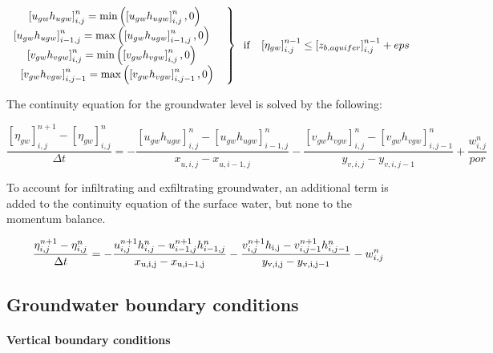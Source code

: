 \begin{equation} \label{2.94)} 
\left. \begin{array}{c} {\left[u_{gw} h_{ugw} \right]_{i,j}^{n} =\min \left(\left[u_{gw} h_{ugw} \right]_{i,j}^{n} ,0\right){\rm \; }} \\ {\left[u_{gw} h_{ugw} \right]_{i-1,j}^{n} =\max \left(\left[u_{gw} h_{ugw} \right]_{i-1,j}^{n} ,0\right){\rm \; \; \; }} \\ {\left[v_{gw} h_{vgw} \right]_{i,j}^{n} =\min \left(\left[v_{gw} h_{vgw} \right]_{i,j}^{n} ,0\right){\rm \; \; \; }} \\ {\left[v_{gw} h_{vgw} \right]_{i,j-1}^{n} =\max \left(\left[v_{gw} h_{vgw} \right]_{i,j-1}^{n} ,0\right)} \end{array}\right\}{\rm \; \; if\; \; \; }\left[\eta _{gw} \right]_{i,j}^{n-1} \le \left[z_{b,aquifer} \right]_{i,j}^{n-1} +eps 
\end{equation} 

The continuity equation for the groundwater level is solved by the following:

\begin{equation} \label{2.95)} 
\frac{\left[\eta _{gw} \right]_{i,j}^{n+1} -\left[\eta _{gw} \right]_{i,j}^{n} }{\Delta t} =-\frac{\left[u_{gw} h_{ugw} \right]_{i,j}^{n} -\left[u_{gw} h_{ugw} \right]_{i-1,j}^{n} }{x_{u,i,j}^{} -x_{u,i-1,j}^{} } -\frac{\left[v_{gw} h_{vgw} \right]_{i,j}^{n} -\left[v_{gw} h_{vgw} \right]_{i,j-1}^{n} }{y_{v,i,j}^{} -y_{v,i,j-1}^{} } +\frac{w_{i,j}^{n} }{por}  
\end{equation} 

To account for infiltrating and exfiltrating groundwater, an additional term is added to the continuity equation of the surface water, but none to the momentum balance.

\begin{equation} \label{2.96)} 
\frac{\eta _{i,j}^{n+1} -\eta _{i,j}^{n} }{\Delta t} =-\frac{u_{i,j}^{n+1} h_{i,j}^{n} -u_{i-1,j}^{n+1} h_{i-1,j}^{n} }{x_{{\rm u,i,j}} -x_{{\rm u,i-1,j}} } -\frac{v_{i,j}^{n+1} h_{{\rm i,j}} -v_{i,j-1}^{n+1} h_{i,j-1}^{n} }{y_{{\rm v,i,j}} -y_{{\rm v,i,j-1}} } -w_{i,j}^{n}  
\end{equation} 

\subsection{ Groundwater boundary conditions}
\paragraph{Vertical boundary conditions}

